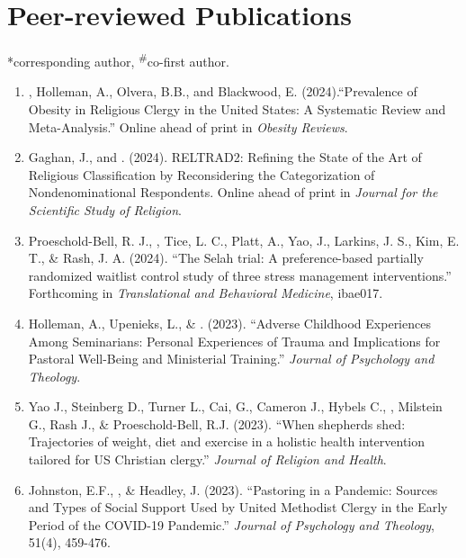 \newcommand{\Revision}{\textit{under revision}}
\newcommand{\CS}{*} %
\newcommand{\CF}{\textsuperscript{\#}} %

\section*{Peer-reviewed Publications}
\CS corresponding author, \CF co-first author.

\begin{enumerate}

\item \Eagle, Holleman, A., Olvera, B.B., and Blackwood, E. (2024).``Prevalence of Obesity in Religious Clergy in the United States: A Systematic Review and Meta-Analysis.'' Online ahead of print in \textit{Obesity Reviews}. 

\item Gaghan, J., and \Eagle. (2024). RELTRAD2: Refining the State of the Art of Religious Classification by Reconsidering the Categorization of Nondenominational Respondents. Online ahead of print in \textit{Journal for the Scientific Study of Religion}. 

\item Proeschold-Bell, R. J., \Eagle, Tice, L. C., Platt, A., Yao, J., Larkins, J. S., Kim, E. T., \& Rash, J. A. (2024). ``The Selah trial: A preference-based partially randomized waitlist control study of three stress management interventions.''  Forthcoming in \textit{Translational and Behavioral Medicine}, ibae017. 

\item Holleman, A., Upenieks, L., \& \Eagle. (2023). ``Adverse Childhood Experiences Among Seminarians: Personal Experiences of Trauma and Implications for Pastoral Well-Being and Ministerial Training.'' \textit{Journal of Psychology and Theology}. 

\item Yao J., Steinberg D., Turner L., Cai, G., Cameron J., Hybels C., \Eagle, Milstein G., Rash J., \& Proeschold-Bell, R.J. (2023). ``When shepherds shed: Trajectories of weight, diet and exercise in a holistic health intervention tailored for US Christian clergy.'' \textit{Journal of Religion and Health}. 

\item Johnston, E.F., \Eagle, \& Headley, J. (2023). ``Pastoring in a Pandemic: Sources and Types of Social Support Used by United Methodist Clergy in the Early Period of the COVID-19 Pandemic.'' \textit{Journal of Psychology and Theology}, 51(4), 459-476. 
	

\end{enumerate}
